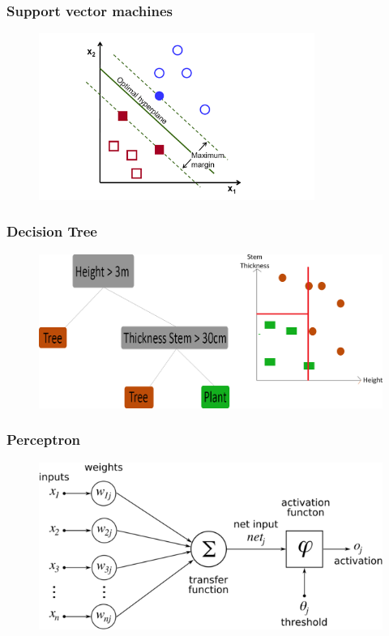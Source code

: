 \documentclass{beamer}
\begin{document}

\begin{frame}
\frametitle{Support vector machines}

	\begin{figure}
		\centering
    	\includegraphics[width=90mm,scale=1]{./img/SVM.png}
	\end{figure}

\end{frame}


\begin{frame}
\frametitle{Decision Tree}

	\begin{figure}
		\centering
   	 	\includegraphics[width=\textwidth,scale=1]{./img/DTExplained.png}
	\end{figure}

\end{frame}


\begin{frame} 
\frametitle{Perceptron}

	\begin{figure}
		\centering
    	\includegraphics[width=\textwidth]{./img/perceptron.png}
	\end{figure}

\end{frame}
\end{document}
